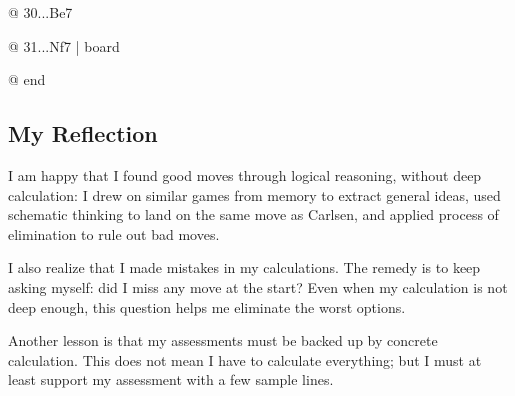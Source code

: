 @ 30...Be7

@ 31...Nf7 | board


@ end
\subsection*{My Reflection}

I am happy that I found good moves through logical reasoning, without deep calculation:
I drew on similar games from memory to extract general ideas, used schematic thinking
to land on the same move as Carlsen, and applied process of elimination to rule out bad moves.

I also realize that I made mistakes in my calculations. The remedy is to keep asking myself:
did I miss any move at the start? Even when my calculation is not deep enough, this question
helps me eliminate the worst options.

Another lesson is that my assessments must be backed up by concrete calculation. This does not
mean I have to calculate everything; but I must at least support my assessment with a few
sample lines.

